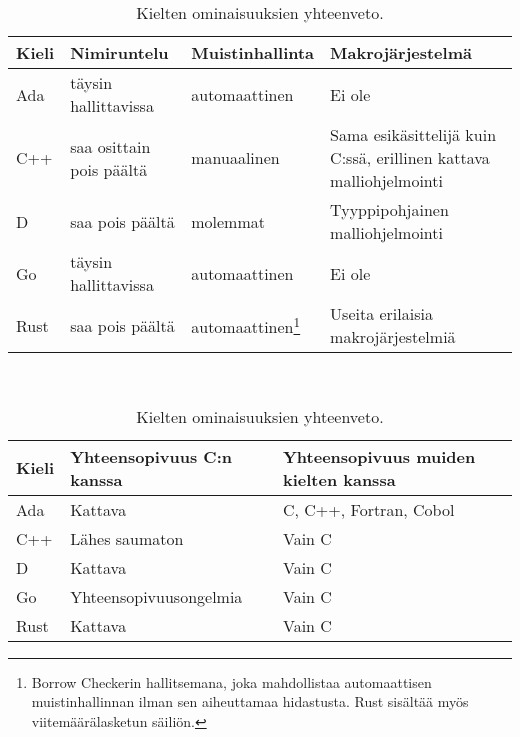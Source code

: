\begin{table}[ht!]
    \begin{adjustbox}{center}
        \kern-0.7cm
        \begin{tabular}{@{}lllp{6.2cm}@{}} \toprule
        Kieli & Nimiruntelu              & Muistinhallinta & Makrojärjestelmä \\ \midrule
        Ada   & täysin hallittavissa     & automaattinen   & Ei ole \\
        C++   & saa osittain pois päältä & manuaalinen     & Sama esikäsittelijä kuin C:ssä, \mbox{erillinen} kattava malliohjelmointi \\
        D     & saa pois päältä          & molemmat        & Tyyppipohjainen malliohjelmointi \\
        Go    & täysin hallittavissa     & automaattinen   & Ei ole \\
            Rust  & saa pois päältä & automaattinen\footnote{Borrow Checkerin
        hallitsemana, joka mahdollistaa automaattisen muistinhallinnan ilman
        sen aiheuttamaa hidastusta. Rust sisältää myös viitemäärälasketun
        säiliön.} & Useita erilaisia makrojärjestelmiä \\ \bottomrule
        \end{tabular}
    \end{adjustbox} \\[0.5cm]

    \begin{adjustbox}{center}
        \begin{tabular}{@{}lll@{}} \toprule
            Kieli & Yhteensopivuus C:n kanssa                                                   & Yhteensopivuus muiden kielten kanssa \\ \midrule
            Ada   & Kattava         & C, C++, Fortran, Cobol \\
            C++   & Lähes saumaton                                                              & Vain C \\
            D     & Kattava         & Vain C \\
            Go    & Yhteensopivuusongelmia   & Vain C \\
            Rust  & Kattava         & Vain C \\ \bottomrule
        \end{tabular}
    \end{adjustbox}
    \caption{
        Kielten ominaisuuksien yhteenveto.
    }
    \label{table:properties}
\end{table}

